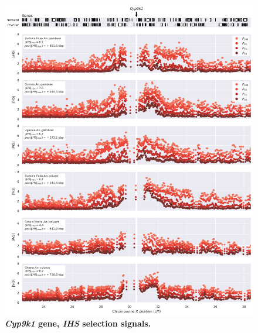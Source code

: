 \documentclass[a4paper,11pt,abstracton,hidelinks]{scrartcl}
\begin{document}
\clearpage


\begin{figure}[t!]
	\begin{center}
		\includegraphics*[width=1.1\linewidth,center]{artwork/locus_cyp9k1_ihs.png}
	\end{center}
	\caption[\textit{Cyp9k1} gene, \textit{IHS} selection signals]{
	\textbf{\textit{Cyp9k1} gene, \textit{IHS} selection signals.}
	} 
	\label{fig:locus_cyp9k1_ihs}
\end{figure}


\clearpage
\end{document}
